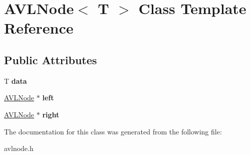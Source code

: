 \hypertarget{classAVLNode}{\section{A\-V\-L\-Node$<$ T $>$ Class Template Reference}
\label{classAVLNode}
}
\subsection*{Public Attributes}
\begin{DoxyCompactItemize}
\item 
\hypertarget{classAVLNode_ab08e416fe66d8a13f8f9431c25baed79}{T {\bfseries data}}\label{classAVLNode_ab08e416fe66d8a13f8f9431c25baed79}

\item 
\hypertarget{classAVLNode_a7a9fcdb847842e26a795337dcdca273b}{\hyperlink{classAVLNode}{A\-V\-L\-Node} $\ast$ {\bfseries left}}\label{classAVLNode_a7a9fcdb847842e26a795337dcdca273b}

\item 
\hypertarget{classAVLNode_a506817bc14b2a3012526dd7a832013cc}{\hyperlink{classAVLNode}{A\-V\-L\-Node} $\ast$ {\bfseries right}}\label{classAVLNode_a506817bc14b2a3012526dd7a832013cc}

\end{DoxyCompactItemize}


The documentation for this class was generated from the following file\-:\begin{DoxyCompactItemize}
\item 
avlnode.\-h\end{DoxyCompactItemize}
